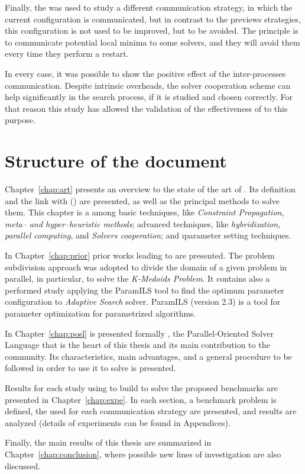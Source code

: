 Finally, the \grp{} was used to study a different communication strategy, in which the current configuration is communicated, but in contrast to the previews strategies, this configuration is not used to be improved, but to be avoided. The principle is to communicate potential local minima to some solvers, and they will avoid them every time they perform a restart. 

In every case, it was possible to show the positive effect of the inter-processes communication. Despite intrinsic overheads, the solver cooperation scheme can help significantly in the search process, if it is studied and chosen correctly. For that reason this study has allowed the validation of the effectiveness of \posl{} to this purpose.

\section{Structure of the document}

Chapter~\ref{chap:art} presents an overview to the state of the art of \COPs{}. Its definition and the link with \CSPs{} (\csp) are presented, as well as the principal methods to solve them. This chapter is a  among basic techniques, like {\it Constraint Propagation}, {\it meta-- and hyper--heuristic methods}; advanced techniques, like {\it hybridization}, {\it parallel computing}, and {\it Solvers cooperation}; and {\i parameter setting techniques}.

In Chapter~\ref{chap:prior} prior works leading to \posl{} are presented. The problem subdivision approach was adopted to divide the domain of a given problem in parallel, in particular, to solve the \textit{K-Medoids Problem}. It contains also a performed study applying the {\sc ParamILS} tool to find the optimum parameter configuration to \textit{Adaptive Search} solver. {\sc ParamILS} (version 2.3) is a tool for parameter optimization for parametrized algorithms.

In Chapter~\ref{chap:posl} is presented formally \posl, the Parallel-Oriented Solver Language that is the heart of this thesis and its main contribution to the community. Its characteristics, main advantages, and a general procedure to be followed in order to use it to solve \CSPs{} is
presented.

Results for each study using \posl{} to build \comstrs{} to solve the proposed benchmarks are presented in Chapter~\ref{chap:expe}. In each section, a benchmark problem is defined, the used \soset{} for each communication strategy are presented, and results are analyzed (details of experiments can be found in Appendices). 

Finally, the main results of this thesis are summarized in Chapter~\ref{chap:conclusion}, where possible new lines of investigation are also discussed.